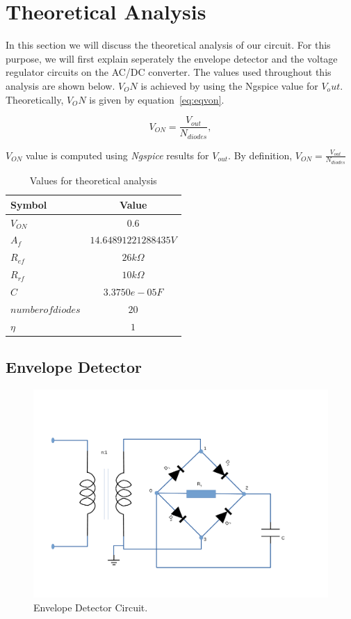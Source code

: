 \newpage
\section{Theoretical Analysis}
\label{sec:analysis}

In this section we will discuss the theoretical analysis of our circuit. For this purpose, we will first explain seperately the envelope detector and the voltage regulator circuits on the AC/DC converter. The values used throughout this analysis are shown below. $V_ON$ is achieved by using the Ngspice value for $V_out$. Theoretically, $V_ON$ is given by equation~\ref{eq:eqvon}.

\begin{equation}
  V_{ON} = \frac{V_{out}}{N_{diodes}},
  \label{eq:eqvon}
\end{equation}

$V_{ON}$ value is computed using \textit{Ngspice} results for $V_{out}$. By definition, $V_{ON}=\frac{V_{out}}{N_{diodes}}$
\begin{table}[h]
    \centering
    \begin{tabular}{|l|c|}
    \hline
    {\bf Symbol} & {\bf Value} \\ \hline
    $V_{ON}$ & $0.6$ \\ \hline
    $A_f$ & $14.64891221288435 V$ \\ \hline
    $R_{ef}$ & $26 k\Omega$  \\ \hline
    $R_{rf}$ & $10 k\Omega$\\ \hline
    $C$ & $3.3750e-05 F$ \\ \hline
    $number of diodes$ & $20$  \\ \hline
    $\eta$ & $1$  \\ \hline
    \end{tabular}
    \caption{Values for theoretical analysis}
    \label{tab:values}
\end{table}


\subsection{Envelope Detector}
\label{sec:envelope}

\begin{figure}[!ht] \centering
\includegraphics[width=0.8\linewidth]{envelopedetector.pdf} 
\squeezeup 
\caption{Envelope Detector Circuit.}
\label{fig:envelope}
\end{figure}

